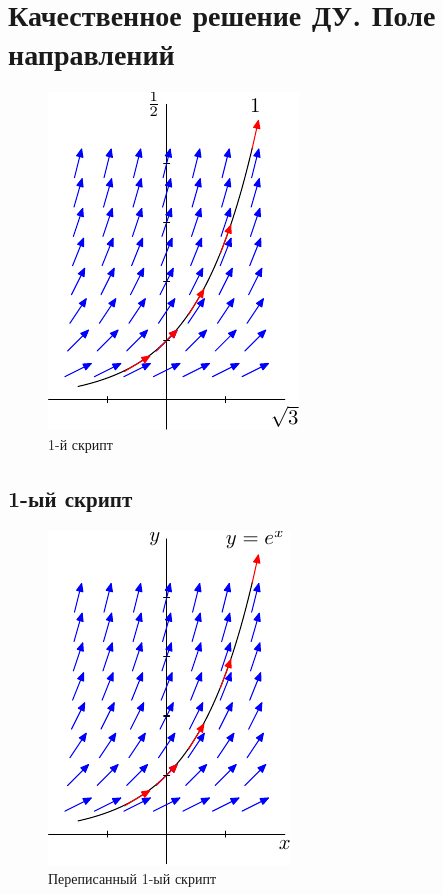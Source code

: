 \chapter{Качественное решение ДУ. Поле направлений}

\begin{figure}[h]
    \includegraphics{fig1-1.pdf}
    \centering
    \caption{1-й скрипт}
\end{figure}

\section*{1-ый скрипт}


\begin{figure}[h]
    \includegraphics{myfig1-1.pdf}
    \centering
    \caption{Переписанный 1-ый скрипт}
\end{figure}

